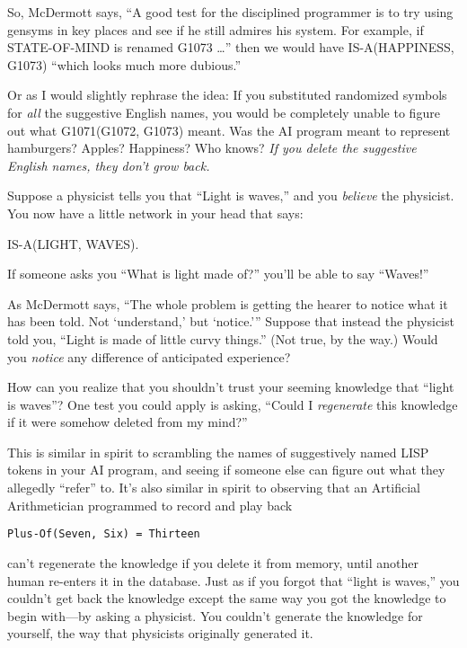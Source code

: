 {
 So, McDermott says, ``A good test for the
disciplined programmer is to try using gensyms in key places and see if
he still admires his system. For example, if STATE-OF-MIND is renamed
G1073 \ldots'' then we would have IS-A(HAPPINESS,
G1073) ``which looks much more
dubious.''}

{
 Or as I would slightly rephrase the idea: If you substituted
randomized symbols for \textit{all} the suggestive English names, you
would be completely unable to figure out what G1071(G1072, G1073)
meant. Was the AI program meant to represent hamburgers? Apples?
Happiness? Who knows? \textit{If you delete the suggestive English
names, they don't grow back.}}

{
 Suppose a physicist tells you that ``Light is
waves,'' and you \textit{believe} the physicist. You
now have a little network in your head that says:}

\begin{center}
 IS-A(LIGHT, WAVES).
\end{center}

{
 If someone asks you ``What is light made
of?'' you'll be able to say
``Waves!'' }

{
 As McDermott says, ``The whole problem is getting
the hearer to notice what it has been told. Not
`understand,' but
`notice.''' Suppose
that instead the physicist told you, ``Light is made
of little curvy things.'' (Not true, by the way.)
Would you \textit{notice} any difference of anticipated experience?}

{
 How can you realize that you shouldn't trust your
seeming knowledge that ``light is
waves''? One test you could apply is asking,
``Could I \textit{regenerate} this knowledge if it
were somehow deleted from my mind?''}

{
 This is similar in spirit to scrambling the names of suggestively
named LISP tokens in your AI program, and seeing if someone else can
figure out what they allegedly
``refer'' to. It's
also similar in spirit to observing that an Artificial Arithmetician
programmed to record and play back}

\begin{center}
\texttt{Plus-Of(Seven, Six) = Thirteen}
\end{center}

{
 can't regenerate the knowledge if you delete it
from memory, until another human re-enters it in the database. Just as
if you forgot that ``light is
waves,'' you couldn't get back the
knowledge except the same way you got the knowledge to begin with---by
asking a physicist. You couldn't generate the knowledge
for yourself, the way that physicists originally generated it. }

